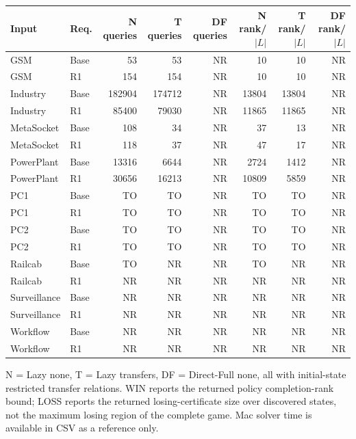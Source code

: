 
\begin{tabular}{llrrrrrr}
\toprule
Input & Req. & N queries & T queries & DF queries & N rank/$|L|$ & T rank/$|L|$ & DF rank/$|L|$ \\
\midrule
GSM & Base & 53 & 53 & NR & 10 & 10 & NR \\
GSM & R1 & 154 & 154 & NR & 10 & 10 & NR \\
Industry & Base & 182904 & 174712 & NR & 13804 & 13804 & NR \\
Industry & R1 & 85400 & 79030 & NR & 11865 & 11865 & NR \\
MetaSocket & Base & 108 & 34 & NR & 37 & 13 & NR \\
MetaSocket & R1 & 118 & 37 & NR & 47 & 17 & NR \\
PowerPlant & Base & 13316 & 6644 & NR & 2724 & 1412 & NR \\
PowerPlant & R1 & 30656 & 16213 & NR & 10809 & 5859 & NR \\
PC1 & Base & TO & TO & NR & TO & TO & NR \\
PC1 & R1 & TO & TO & NR & TO & TO & NR \\
PC2 & Base & TO & TO & NR & TO & TO & NR \\
PC2 & R1 & TO & TO & NR & TO & TO & NR \\
Railcab & Base & TO & NR & NR & TO & NR & NR \\
Railcab & R1 & NR & NR & NR & NR & NR & NR \\
Surveillance & Base & NR & NR & NR & NR & NR & NR \\
Surveillance & R1 & NR & NR & NR & NR & NR & NR \\
Workflow & Base & NR & NR & NR & NR & NR & NR \\
Workflow & R1 & NR & NR & NR & NR & NR & NR \\
\bottomrule
\end{tabular}
{\par\smallskip\footnotesize N = Lazy none, T = Lazy transfers, DF = Direct-Full none, all with initial-state restricted transfer relations. WIN reports the returned policy completion-rank bound; LOSS reports the returned losing-certificate size over discovered states, not the maximum losing region of the complete game. Mac solver time is available in CSV as a reference only.}
